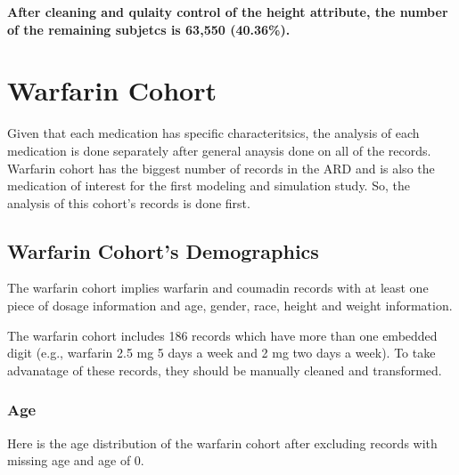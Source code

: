 \documentclass{article}
\begin{document}
\textbf{After cleaning and qulaity control of the height attribute, the number of the remaining subjetcs is 63,550 (40.36\%).}



\section{Warfarin Cohort}
Given that each medication has specific characteritsics, the analysis of each medication is done separately after general anaysis done on all of the records.
Warfarin cohort has the biggest number of records in the ARD and is also the medication of interest for the first modeling and simulation study. So, the analysis of this cohort's records is done first.  

\subsection{Warfarin Cohort's Demographics}

The warfarin cohort implies warfarin and coumadin records with at least one piece of dosage information and age, gender, race, height and weight information.

The warfarin cohort includes 186 records which have more than one embedded digit 
(e.g., warfarin 2.5 mg 5 days a week and 2 mg two days a week). 
To take advanatage of these records, they should be manually cleaned and transformed.   

\subsubsection{Age}

Here is the age distribution of the warfarin cohort after excluding records with missing age and age of 0.
\end{document}

